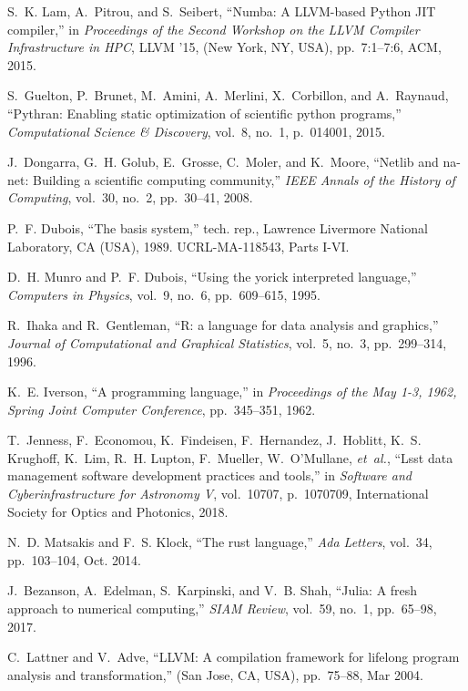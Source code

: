 \documentclass[twocolumn]{article}
\begin{document}
\begin{thebibliography}{10}
S.~K. Lam, A.~Pitrou, and S.~Seibert, ``Numba: A {LLVM}-based {P}ython {JIT}
  compiler,'' in {\em Proceedings of the Second Workshop on the LLVM Compiler
  Infrastructure in HPC}, LLVM '15, (New York, NY, USA), pp.~7:1--7:6, ACM,
  2015.

S.~Guelton, P.~Brunet, M.~Amini, A.~Merlini, X.~Corbillon, and A.~Raynaud,
  ``Pythran: Enabling static optimization of scientific python programs,'' {\em
  Computational Science \& Discovery}, vol.~8, no.~1, p.~014001, 2015.

J.~Dongarra, G.~H. Golub, E.~Grosse, C.~Moler, and K.~Moore, ``Netlib and
  na-net: Building a scientific computing community,'' {\em IEEE Annals of the
  History of Computing}, vol.~30, no.~2, pp.~30--41, 2008.

P.~F. Dubois, ``The basis system,'' tech. rep., Lawrence Livermore National
  Laboratory, CA (USA), 1989.
\newblock UCRL-MA-118543, Parts I-VI.

D.~H. Munro and P.~F. Dubois, ``Using the yorick interpreted language,'' {\em
  Computers in Physics}, vol.~9, no.~6, pp.~609--615, 1995.

R.~Ihaka and R.~Gentleman, ``R: a language for data analysis and graphics,''
  {\em Journal of Computational and Graphical Statistics}, vol.~5, no.~3,
  pp.~299--314, 1996.

K.~E. Iverson, ``A programming language,'' in {\em Proceedings of the May 1-3,
  1962, Spring Joint Computer Conference}, pp.~345--351, 1962.

T.~Jenness, F.~Economou, K.~Findeisen, F.~Hernandez, J.~Hoblitt, K.~S.
  Krughoff, K.~Lim, R.~H. Lupton, F.~Mueller, W.~O'Mullane, {\em et~al.},
  ``Lsst data management software development practices and tools,'' in {\em
  Software and Cyberinfrastructure for Astronomy V}, vol.~10707, p.~1070709,
  International Society for Optics and Photonics, 2018.

N.~D. Matsakis and F.~S. Klock, ``The rust language,'' {\em Ada Letters},
  vol.~34, pp.~103--104, Oct. 2014.

J.~Bezanson, A.~Edelman, S.~Karpinski, and V.~B. Shah, ``Julia: A fresh
  approach to numerical computing,'' {\em SIAM {R}eview}, vol.~59, no.~1,
  pp.~65--98, 2017.

C.~Lattner and V.~Adve, ``{LLVM}: A compilation framework for lifelong program
  analysis and transformation,'' (San Jose, CA, USA), pp.~75--88, Mar 2004.

\end{thebibliography}
\end{document}
